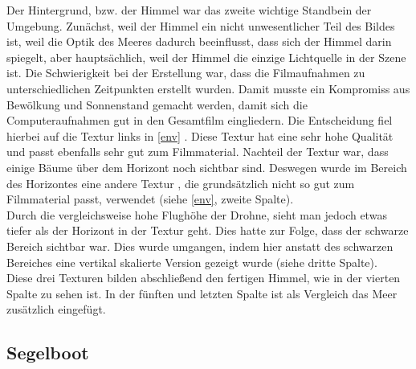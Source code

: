 Der Hintergrund, bzw. der Himmel war das zweite wichtige Standbein der Umgebung. Zunächst, weil der Himmel ein nicht unwesentlicher Teil des Bildes ist, weil die Optik des Meeres dadurch beeinflusst, dass sich der Himmel darin spiegelt, aber hauptsächlich, weil der Himmel die einzige Lichtquelle in der Szene ist. Die Schwierigkeit bei der Erstellung war, dass die Filmaufnahmen zu unterschiedlichen Zeitpunkten erstellt wurden. Damit musste ein Kompromiss aus Bewölkung und Sonnenstand gemacht werden, damit sich die Computeraufnahmen gut in den Gesamtfilm eingliedern. Die Entscheidung fiel hierbei auf die Textur links in \autoref{env} \cite{Sunflowers}. Diese Textur hat eine sehr hohe Qualität und passt ebenfalls sehr gut zum Filmmaterial. Nachteil der Textur war, dass einige Bäume über dem Horizont noch sichtbar sind. Deswegen wurde im Bereich des Horizontes eine andere Textur \cite{Sky}, die grundsätzlich nicht so gut zum Filmmaterial passt, verwendet (siehe \autoref{env}, zweite Spalte).\\
Durch die vergleichsweise hohe Flughöhe der Drohne, sieht man jedoch etwas tiefer als der Horizont in der Textur geht. Dies hatte zur Folge, dass der schwarze Bereich sichtbar war. Dies wurde umgangen, indem hier anstatt des schwarzen Bereiches eine vertikal skalierte Version gezeigt wurde (siehe dritte Spalte).\\
Diese drei Texturen bilden abschließend den fertigen Himmel, wie in der vierten Spalte zu sehen ist. In der fünften und letzten Spalte ist als Vergleich das Meer zusätzlich eingefügt.

\subsection{Segelboot}


